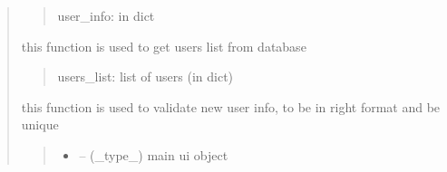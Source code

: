 \documentclass[letterpaper,10pt,english]{sphinxmanual}
\begin{document}
\begin{quote}
\begin{savenotes}
\begin{fulllineitems}
\begin{quote}
\begin{description}
\sphinxAtStartPar
user\_info: in dict

\end{description}\end{quote}

\end{fulllineitems}\end{savenotes}


\begin{savenotes}\begin{fulllineitems}
\label{\detokenize{setting/backend/user_management_funcs:oxin.backend.user_management_funcs.get_users_from_db}}
\pysigstartsignatures
{}
\pysigstopsignatures
\sphinxAtStartPar
this function is used to get users list from database
\begin{quote}\begin{description}
\sphinxAtStartPar
users\_list: list of users (in dict)

\end{description}\end{quote}

\end{fulllineitems}\end{savenotes}


\begin{savenotes}\begin{fulllineitems}
\label{\detokenize{setting/backend/user_management_funcs:oxin.backend.user_management_funcs.new_user_info_validation}}
\pysigstartsignatures
{}
\pysigstopsignatures
\sphinxAtStartPar
this function is used to validate new user info, to be in right format and be unique
\begin{quote}\begin{description}
\begin{itemize}
\item {} 
\sphinxAtStartPar
{} – (\_type\_) main ui object


\end{itemize}
\end{description}
\end{quote}
\end{fulllineitems}
\end{savenotes}
\end{quote}
\end{document}
